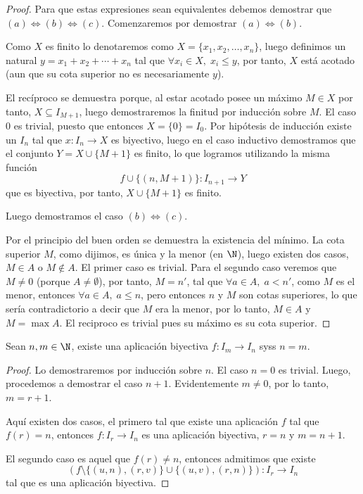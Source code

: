 \documentclass[11pt,oneside,a4paper]{book}
\begin{document}
\begin{proof}
Para que estas expresiones sean equivalentes debemos demostrar que $(a)\iff(b)\iff(c)$. Comenzaremos por demostrar $(a)\iff(b)$.

Como $X$ es finito lo denotaremos como $X=\{x_1,x_2,\dots,x_n\}$, luego definimos un natural $y=x_1+x_2+\cdots+x_n$ tal que $\forall x_i\in X,\;x_i\leq y$, por tanto, $X$ está acotado (aun que su cota superior no es necesariamente $y$).

El recíproco se demuestra porque, al estar acotado posee un máximo $M\in X$ por tanto, $X\subseteq I_{M+1}$, luego demostraremos la finitud por inducción sobre $M$. El caso 0 es trivial, puesto que entonces $X=\{0\}=I_0$. Por hipótesis de inducción existe un $I_n$ tal que $x:I_n\rightarrow X$ es biyectivo, luego en el caso inductivo demostramos que el conjunto $Y=X\cup\{M+1\}$ es finito, lo que logramos utilizando la misma función
$$f\cup\{(n,M+1)\}:I_{n+1}\rightarrow Y$$
que es biyectiva, por tanto, $X\cup\{M+1\}$ es finito.

Luego demostramos el caso $(b)\iff(c)$.

Por el principio del buen orden se demuestra la existencia del mínimo. La cota superior $M$, como dijimos, es única y la menor (en $\N$), luego existen dos casos, $M\in A$ o $M\notin A$. El primer caso es trivial. Para el segundo caso veremos que $M\neq 0$ (porque $A\neq\emptyset$), por tanto, $M=n'$, tal que $\forall a\in A,\;a\lt n'$, como $M$ es el menor, entonces $\forall a\in A,\;a\leq n$, pero entonces $n$ y $M$ son cotas superiores, lo que sería contradictorio a decir que $M$ era la menor, por lo tanto, $M\in A$ y $M=\max A$. El reciproco es trivial pues su máximo es su cota superior.
\end{proof}
\begin{thm}
Sean $n,m\in\N$, existe una aplicación biyectiva $f:I_m\rightarrow I_n$ syss $n=m$.
\end{thm}
\begin{proof}
Lo demostraremos por inducción sobre $n$. El caso $n=0$ es trivial. Luego, procedemos a demostrar el caso $n+1$. Evidentemente $m\neq 0$, por lo tanto, $m=r+1$.

Aquí existen dos casos, el primero tal que existe una aplicación $f$ tal que $f(r)=n$, entonces $f:I_r\rightarrow I_n$ es una aplicación biyectiva, $r=n$ y $m=n+1$.

El segundo caso es aquel que $f(r)\neq n$, entonces admitimos que existe
$$(f\setminus\{(u,n),(r,v)\}\cup\{(u,v),(r,n)\}):I_r\rightarrow I_n$$
tal que es una aplicación biyectiva.
\end{proof}
\end{document}
